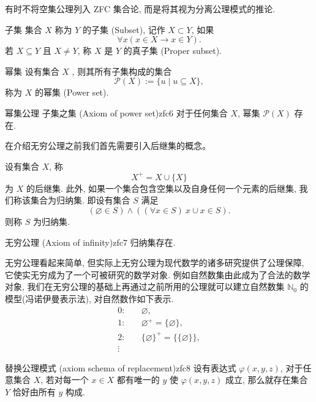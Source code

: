 \documentclass[cn,toc=twocol]{elegantbook}
\begin{document}
有时不将空集公理列入 ZFC 集合论, 而是将其视为分离公理模式的推论.

\begin{definition}{子集}
集合 $X$ 称为 $Y$ 的子集 (Subset), 记作 $X \subset Y$, 如果
	\[
		\forall x(x \in X \rightarrow x \in Y).
	\]
	若 $X \subseteq Y$ 且 $X \neq Y$, 称 $X$ 是 $Y$ 的真子集 (Proper subset).
\end{definition}

\begin{definition}{幂集}
	设有集合 $X$ , 则其所有子集构成的集合
	\[
		\mathcal{P}(X) := \{u\mid u \subseteq X\},
	\]
称为 $X$ 的幂集 (Power set).
\end{definition}

\begin{axiom}{幂集公理 子集之集 (Axiom of power set)}{zfc6}
	对于任何集合 $X$, 幂集 $\mathcal{P}(X)$ 存在.
\end{axiom}


在介绍无穷公理之前我们首先需要引入后继集的概念。 
\begin{definition}
	设有集合 $X$, 称 
	\[
		X^+=X\cup \{X\}
	\]
	为 $X$ 的后继集. 此外, 如果一个集合包含空集以及自身任何一个元素的后继集, 我们称该集合为归纳集. 即设有集合 $S$ 满足
	\[
		(\varnothing \in S) \land ((\forall x \in S) \ x \cup {x} \in S).
	\]
	则称 $S$ 为归纳集.
\end{definition}

\begin{axiom}{无穷公理 (Axiom of infinity)}{zfc7}
	归纳集存在.
\end{axiom}

无穷公理看起来简单, 但实际上无穷公理为现代数学的诸多研究提供了公理保障, 它使实无穷成为了一个可被研究的数学对象. 例如自然数集由此成为了合法的数学对象, 我们在无穷公理的基础上再通过之前所用的公理就可以建立自然数集 $\mathbb{N}_0$ 的模型(冯诺伊曼表示法), 对自然数作如下表示.
	\[
		\begin{aligned}
			0:\quad & \varnothing,\\
			1:\quad & \varnothing^+=\{\varnothing\},\\
			2:\quad & \{\varnothing\}^+=\{\{\varnothing\}\},\\
			\vdots & 
		\end{aligned}
	\]
	
\begin{axiom}{替换公理模式 (axiom schema of replacement)}{zfc8}
	设有表达式 $\varphi (x, y, z)$, 对于任意集合 $X$, 若对每一个 $x \in X$ 都有唯一的 $y$ 使 $\varphi (x, y, z)$ 成立, 那么就存在集合 $Y$ 恰好由所有 $y$ 构成.
\end{axiom}
\end{document}
